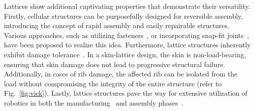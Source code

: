 Lattices show additional captivating properties that demonstrate their versatility. Firstly, cellular structures can be purposefully designed for reversible assembly, introducing the concept of rapid assembly and easily repairable structures. Various approaches, such as utilizing fasteners~, or incorporating snap-fit joints~, have been proposed to realize this idea. Furthermore, lattice structures inherently exhibit damage tolerance~. In a skin-lattice design, the skin is non-load-bearing, ensuring that skin damage does not lead to progressive structural failure. Additionally, in cases of rib damage, the affected rib can be isolated from the load without compromising the integrity of the entire structure (refer to Fig.~\ref{fig:vick}). Lastly, lattice structures pave the way for extensive utilization of robotics in both the manufacturing~ and assembly phases~.
